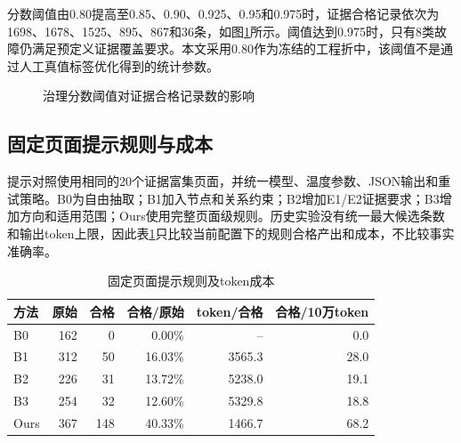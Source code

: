 \documentclass[conference,a4paper]{IEEEtran}
\begin{document}
分数阈值由0.80提高至0.85、0.90、0.925、0.95和0.975时，证据合格记录依次为1698、1678、1525、895、867和36条，如图\ref{fig:threshold}所示。阈值达到0.975时，只有8类故障仍满足预定义证据覆盖要求。本文采用0.80作为冻结的工程折中，该阈值不是通过人工真值标签优化得到的统计参数。

\begin{figure}[t]
\centering
{}
\caption{治理分数阈值对证据合格记录数的影响}
\label{fig:threshold}
\end{figure}

\subsection{固定页面提示规则与成本}

提示对照使用相同的20个证据富集页面，并统一模型、温度参数、JSON输出和重试策略。B0为自由抽取；B1加入节点和关系约束；B2增加E1/E2证据要求；B3增加方向和适用范围；Ours使用完整页面级规则。历史实验没有统一最大候选条数和输出token上限，因此表\ref{tab:prompt}只比较当前配置下的规则合格产出和成本，不比较事实准确率。

\begin{table}[H]
\caption{固定页面提示规则及token成本}
\label{tab:prompt}
\centering
\fontsize{7.5}{8.5}\selectfont
\begin{tabular}{lrrrrr}
\toprule
方法 & 原始 & 合格 & 合格/原始 & token/合格 & 合格/10万token \\
\midrule
B0   & 162 & 0   & 0.00\%  & --     & 0.0 \\
B1   & 312 & 50  & 16.03\% & 3565.3 & 28.0 \\
B2   & 226 & 31  & 13.72\% & 5238.0 & 19.1 \\
B3   & 254 & 32  & 12.60\% & 5329.8 & 18.8 \\
Ours & 367 & 148 & 40.33\% & 1466.7 & 68.2 \\
\bottomrule
\end{tabular}
\end{table}
\end{document}
